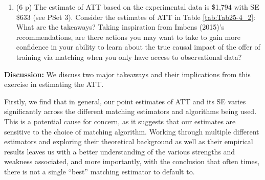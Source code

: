 \documentclass[
]{article}
\newenvironment{Shaded}{\begin{snugshade}}{\end{snugshade}}
\newcommand{\AttributeTok}[1]{\textcolor[rgb]{0.13,0.29,0.53}{#1}}
\newcommand{\CommentTok}[1]{\textcolor[rgb]{0.56,0.35,0.01}{\textit{#1}}}
\newcommand{\DecValTok}[1]{\textcolor[rgb]{0.00,0.00,0.81}{#1}}
\newcommand{\FunctionTok}[1]{\textcolor[rgb]{0.13,0.29,0.53}{\textbf{#1}}}
\newcommand{\NormalTok}[1]{#1}
\newcommand{\OtherTok}[1]{\textcolor[rgb]{0.56,0.35,0.01}{#1}}
\newcommand{\SpecialCharTok}[1]{\textcolor[rgb]{0.81,0.36,0.00}{\textbf{#1}}}
\newcommand{\StringTok}[1]{\textcolor[rgb]{0.31,0.60,0.02}{#1}}
\providecommand{\tightlist}{%
  \setlength{\itemsep}{0pt}\setlength{\parskip}{0pt}}
\begin{document}
\begin{Shaded}
\end{Shaded}

\begin{enumerate}
\def\labelenumi{\arabic{enumi}.}
\setcounter{enumi}{8}
\tightlist
\item
  (6 p) The estimate of ATT based on the experimental data is \$1,794
  with SE \$633 (see PSet 3). Consider the estimates of ATT in Table
  \ref{tab:Tab25-4_2}: What are the takeaways? Taking inspiration from
  Imbens (2015)'s recommendations, are there actions you may want to
  take to gain more confidence in your ability to learn about the true
  causal impact of the offer of training via matching when you only have
  access to observational data?
\end{enumerate}

\textbf{Discussion:} We discuss two major takeaways and their
implications from this exercise in estimating the ATT.

Firstly, we find that in general, our point estimates of ATT and its SE
varies significantly across the different matching estimators and
algorithms being used. This is a potential cause for concern, as it
suggests that our estimates are sensitive to the choice of matching
algorithm. Working through multiple different estimators and exploring
their theoretical background as well as their empirical results leaves
us with a better understanding of the various strengths and weakness
associated, and more importantly, with the conclusion that often times,
there is not a single ``best'' matching estimator to default to.
\end{document}
